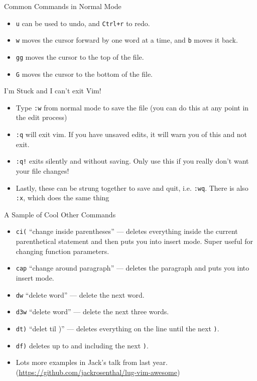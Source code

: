 \documentclass{lug}
\begin{document}
\begin{frame}{Common Commands in Normal Mode}
    \begin{itemize}
        \item \texttt{u} can be used to undo, and \texttt{Ctrl+r} to redo.
        \item \texttt{w} moves the cursor forward by one word at a time, and
            \texttt{b} moves it back.
        \item \texttt{gg} moves the cursor to the top of the file.
        \item \texttt{G} moves the cursor to the bottom of the file.
    \end{itemize}
\end{frame}

\begin{frame}{I'm Stuck and I can't exit Vim!}
    \begin{itemize}
        \item Type \texttt{:w} from normal mode to save the file (you can do
            this at any point in the edit process)
        \item \texttt{:q} will exit vim. If you have unsaved edits, it will warn
            you of this and not exit.
        \item \texttt{:q!} exits silently and without saving. Only use this if
            you really don't want your file changes!
        \item Lastly, these can be strung together to save and quit, i.e.
            \texttt{:wq}. There is also \texttt{:x}, which does the same thing
    \end{itemize}
\end{frame}

\begin{frame}{A Sample of Cool Other Commands}
    \begin{itemize}
        \item \texttt{ci(} ``change inside parentheses'' --- deletes everything
            inside the current parenthetical statement and then puts you into
            insert mode. Super useful for changing function parameters.
        \item \texttt{cap} ``change around paragraph'' --- deletes the paragraph
            and puts you into insert mode.
        \item \texttt{dw} ``delete word'' --- delete the next word.
        \item \texttt{d3w} ``delete word'' --- delete the next three words.
        \item \texttt{dt)} ``delet til )'' --- deletes everything on the line
            until the next \texttt{)}.
        \item \texttt{df)} deletes up to and including the next \texttt{)}.
        \item Lots more examples in Jack's talk from last year.
            (\url{https://github.com/jackrosenthal/lug-vim-awesome})
    \end{itemize}
\end{frame}
\end{document}
